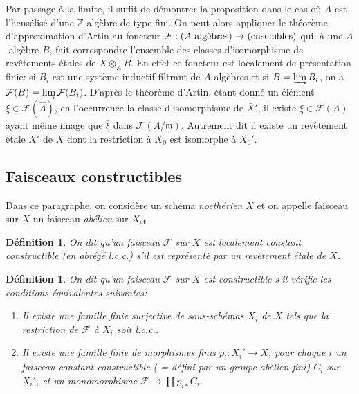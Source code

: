 \documentclass{book}
\newcommand{\cF}{\mathcal{F}}
\newcommand{\dZ}{\mathbb{Z}}
\newcommand{\fm}{\mathfrak{m}}
\newcommand{\et}[1]{{#1}_{\textnormal{et}}}
\newtheorem{definition}[subsubsection]{Définition}
\begin{document}
Par passage à la limite, il suffit de démontrer la proposition dans le cas 
où $A$ est l'hensélisé d'une $\dZ$-algèbre de type fini. On peut alors 
appliquer le théorème d'approximation d'Artin au foncteur 
$\cF:(\textnormal{$A$-algèbres}) \to (\textnormal{ensembles})$ qui, à une 
$A$-algèbre $B$, fait correspondre l'ensemble des classes d'isomorphisme de 
revêtements étales de $X\otimes_A B$. En effet ce foncteur est localement de 
présentation finie: si $B_i$ est une système inductif filtrant de 
$A$-algèbres et si $B=\varinjlim B_i$, on a $\cF(B) = \varinjlim \cF(B_i)$. 
D'après le théorème d'Artin, étant donné un élément 
$\xi\in \cF(\hat A)$, en l'occurrence la classe d'isomorphisme de $\bar X'$, il 
existe $\xi\in \cF(A)$ ayant même image que $\bar\xi$ dans $\cF(A/\fm)$. 
Autrement dit il existe un revêtement étale $X'$ de $X$ dont la restriction 
à $X_0$ est isomorphe à $X_0'$. 










\subsection{Faisceaux constructibles}\label{I:4-3}

Dans ce paragraphe, on considère un schéma \emph{noethérien} $X$ et on 
appelle faisceau sur $X$ un faisceau \emph{abélien} sur $\et X$. 





\begin{definition}\label{I:4-3-1}
On dit qu'un faisceau $\cF$ sur $X$ est \emph{localement constant constructible} 
(en abrégé l.c.c.) s'il est représenté par un revêtement étale de 
$X$. 
\end{definition}





\begin{definition}\label{I:4-3-2}
On dit qu'un faisceau $\cF$ sur $X$ est \emph{constructible} s'il vérifie les 
conditions équivalentes suivantes:
\begin{enumerate}[\indent (i)]
  \item Il existe une famille finie surjective de sous-schémas $X_i$ de $X$ 
     tels que la restriction de $\cF$ à $X_i$ soit l.c.c..
  \item Il existe une famille finie de morphismes finis $p_i:X_i'\to X$, pour 
    chaque $i$ un faisceau constant constructible ( = défini par un groupe 
    abélien fini) $C_i$ sur $X_i'$, et un monomorphisme 
    $\cF\to \prod p_{i*} C_i$. 
\end{enumerate}
\end{definition}
\end{document}
